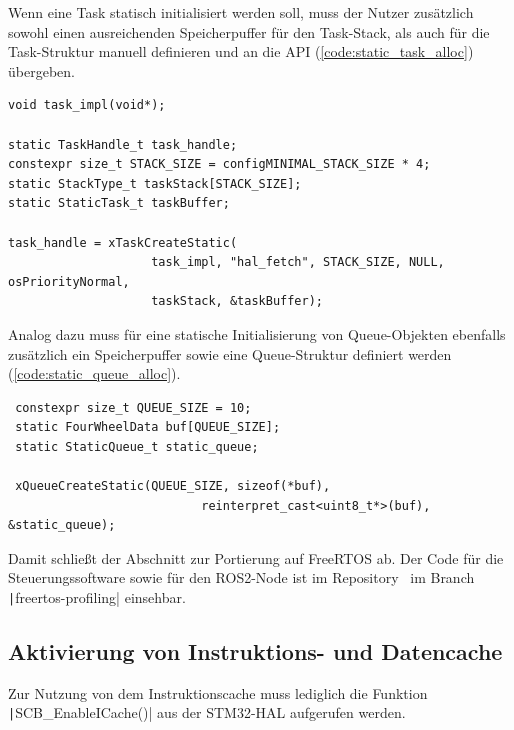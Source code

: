 Wenn eine Task statisch initialisiert werden soll, muss der Nutzer zusätzlich
sowohl einen ausreichenden Speicherpuffer für den Task-Stack, als auch für die
Task-Struktur manuell definieren und an die API (\ref{code:static_task_alloc})
übergeben.

\begin{code}
\begin{verbatim}
void task_impl(void*);

static TaskHandle_t task_handle;
constexpr size_t STACK_SIZE = configMINIMAL_STACK_SIZE * 4;
static StackType_t taskStack[STACK_SIZE];
static StaticTask_t taskBuffer;

task_handle = xTaskCreateStatic(
                    task_impl, "hal_fetch", STACK_SIZE, NULL, osPriorityNormal,
                    taskStack, &taskBuffer);
\end{verbatim}
    \label{code:static_task_alloc}
\end{code}

Analog dazu muss für eine statische Initialisierung von Queue-Objekten ebenfalls
zusätzlich ein Speicherpuffer sowie eine Queue-Struktur definiert werden
(\ref{code:static_queue_alloc}).

\begin{code}
\begin{verbatim}
 constexpr size_t QUEUE_SIZE = 10;
 static FourWheelData buf[QUEUE_SIZE];
 static StaticQueue_t static_queue;

 xQueueCreateStatic(QUEUE_SIZE, sizeof(*buf),
                           reinterpret_cast<uint8_t*>(buf), &static_queue);
\end{verbatim}
    \label{code:static_queue_alloc}
\end{code}

Damit schließt der Abschnitt zur Portierung auf FreeRTOS ab. Der Code für die
Steuerungssoftware sowie für den ROS2-Node ist im
Repository~\cite{mecarover_freertos_profiling} im Branch
\linebreak\texttt|freertos-profiling| einsehbar.

\subsection{Aktivierung von Instruktions- und Datencache}

Zur Nutzung von dem Instruktionscache muss lediglich die Funktion
\texttt|SCB_EnableICache()| aus der STM32-HAL aufgerufen werden.

